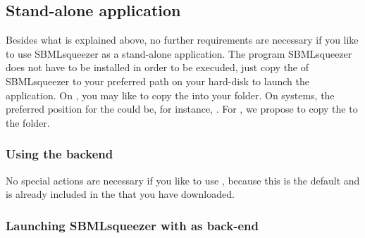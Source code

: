 \subsection{Stand-alone application}
\label{sec:StandAlone}

Besides what is explained above, no further requirements are necessary if you
like to use SBMLsqueezer as a stand-alone application.
The program SBMLsqueezer does not have to be installed in order to be execuded, 
just copy the \JAR of SBMLsqueezer to your preferred path on your hard-disk
to launch the application.
On \MacOSX, you may like to copy the \JAR into your
folder.
On \Windows systems, the preferred position for the \JAR could be, for
instance,
.
For \Linux, we propose to copy the \JAR to the  folder.


\subsubsection{Using the \JSBML backend}

No special actions are necessary if you like to use \JSBML, because this is the
default and \JSBML is already included in the \JAR that you have downloaded.

\subsubsection{Launching SBMLsqueezer with \libSBML as back-end}

